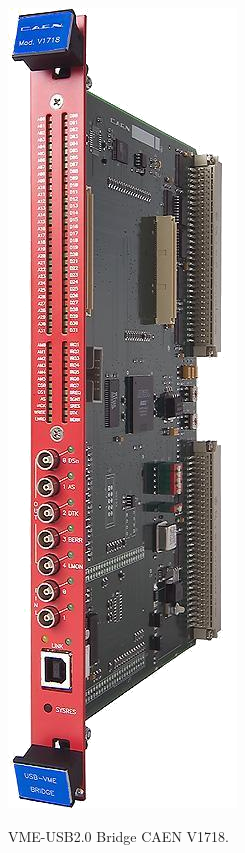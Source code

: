 \marginpar
{
	\centering
	\includegraphics[width=0.5\marginparwidth]{GLA/VMEUSB.png}
	\captionsetup{type=figure}\caption{VME-USB2.0 Bridge CAEN V1718.}
	\label{VME}
}

